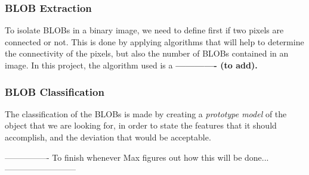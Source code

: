 \subsubsection{BLOB Extraction}
To isolate BLOBs in a binary image, we need to define first if two pixels are connected or not. This is done by applying algorithms that will help to determine the connectivity of the pixels, but also the number of BLOBs contained in an image.
In this project, the algorithm used is a \textbf{------------- (to add).}
\subsubsection{BLOB Classification}
The classification of the BLOBs is made by creating a \textit{prototype model} of the object that we are looking for, in order to state the features that it should accomplish, and the deviation that would be acceptable.

---------------- To finish whenever Max figures out how this will be done... --------------------------
